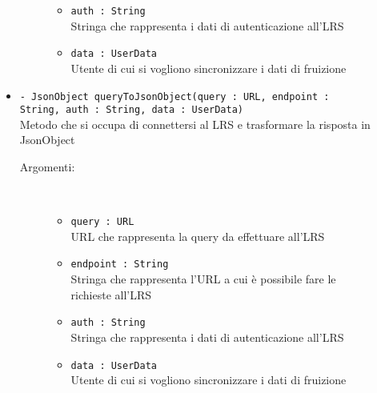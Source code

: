 \documentclass[../Tesi.tex]{subfiles}
\begin{document}
\begin{description}
\begin{itemize}
\begin{description}
\begin{itemize}
						\item \texttt{auth : String}\\
						Stringa che rappresenta i dati di autenticazione all'LRS

						\item \texttt{data : UserData}\\
						Utente di cui si vogliono sincronizzare i dati di fruizione
					\end{itemize}
				\end{description}

				\item \texttt{- JsonObject queryToJsonObject(query : URL, endpoint : String, auth : String, data : UserData)}\\
				Metodo che si occupa di connettersi al LRS e trasformare la risposta in JsonObject
				\begin{description}
					\item[Argomenti:] \
					\begin{itemize}
						\item \texttt{query : URL}\\
						URL che rappresenta la query da effettuare all'LRS

						\item \texttt{endpoint : String}\\
						Stringa che rappresenta l'URL a cui è possibile fare le richieste all'LRS

						\item \texttt{auth : String}\\
						Stringa che rappresenta i dati di autenticazione all'LRS

						\item \texttt{data : UserData}\\
						Utente di cui si vogliono sincronizzare i dati di fruizione
					\end{itemize}
				\end{description}

			\end{itemize}
		\end{description}
\end{document}
